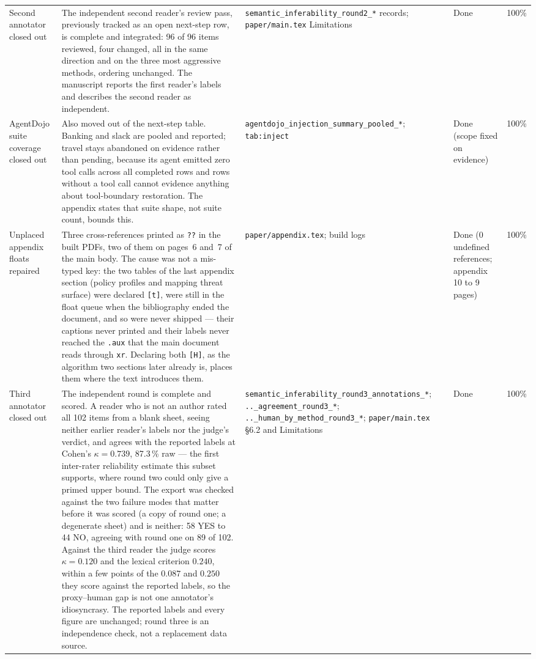 \documentclass[11pt]{article}
\begin{document}
\begin{longtable}{p{}p{}p{}p{}p{}}
Second annotator closed out & The independent second reader's review pass, previously tracked as an open next-step row, is complete and integrated: 96 of 96 items reviewed, four changed, all in the same direction and on the three most aggressive methods, ordering unchanged. The manuscript reports the first reader's labels and describes the second reader as independent. & \texttt{semantic\_inferability\_round2\_*} records; \texttt{paper/main.tex} Limitations & Done & 100\% \\
AgentDojo suite coverage closed out & Also moved out of the next-step table. Banking and slack are pooled and reported; travel stays abandoned on evidence rather than pending, because its agent emitted zero tool calls across all completed rows and rows without a tool call cannot evidence anything about tool-boundary restoration. The appendix states that suite shape, not suite count, bounds this. & \texttt{agentdojo\_injection\_summary\_pooled\_*}; \texttt{tab:inject} & Done (scope fixed on evidence) & 100\% \\
Unplaced appendix floats repaired & Three cross-references printed as \texttt{??} in the built PDFs, two of them on pages~6 and~7 of the main body. The cause was not a mis-typed key: the two tables of the last appendix section (policy profiles and mapping threat surface) were declared \texttt{[t]}, were still in the float queue when the bibliography ended the document, and so were never shipped --- their captions never printed and their labels never reached the \texttt{.aux} that the main document reads through \texttt{xr}. Declaring both \texttt{[H]}, as the algorithm two sections later already is, places them where the text introduces them. & \texttt{paper/appendix.tex}; build logs & Done (0 undefined references; appendix 10 to 9 pages) & 100\% \\
Third annotator closed out & The independent round is complete and scored. A reader who is not an author rated all 102 items from a blank sheet, seeing neither earlier reader's labels nor the judge's verdict, and agrees with the reported labels at Cohen's $\kappa=0.739$, 87.3\,\% raw --- the first inter-rater reliability estimate this subset supports, where round two could only give a primed upper bound. The export was checked against the two failure modes that matter before it was scored (a copy of round one; a degenerate sheet) and is neither: 58 YES to 44 NO, agreeing with round one on 89 of 102. Against the third reader the judge scores $\kappa=0.120$ and the lexical criterion $0.240$, within a few points of the $0.087$ and $0.250$ they score against the reported labels, so the proxy--human gap is not one annotator's idiosyncrasy. The reported labels and every figure are unchanged; round three is an independence check, not a replacement data source. & \texttt{semantic\_inferability\_round3\_annotations\_*}; \texttt{..\_agreement\_round3\_*}; \texttt{..\_human\_by\_method\_round3\_*}; \texttt{paper/main.tex} \S6.2 and Limitations & Done & 100\% \\

\end{longtable}
\end{document}
